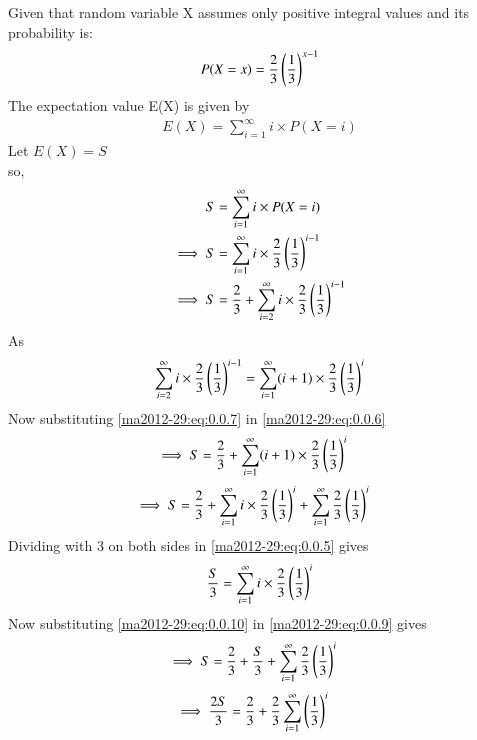 %
  Given that random variable X  assumes only positive integral values and its probability is:
  \begin{align}
      P(X=x)=\frac{2}{3}\left(\frac{1}{3}\right)^{x-1}
  \end{align}
  The expectation value E(X) is given by 
  \begin{align}
      E(X)=\sum_{i=1}^{\infty} i \times P(X=i)
  \end{align}
  Let $E(X)=S$\\
  so,
  \begin{align}
      S&=\sum_{i=1}^{\infty} i \times P(X=i)\\
    \implies S&=\sum_{i=1}^{\infty} i \times
      \frac{2}{3}\left(\frac{1}{3}\right)^{i-1}\label{ma2012-29:eq:0.0.5}\\
     \implies S&=\frac{2}{3}+\sum_{i=2}^{\infty} i \times
      \frac{2}{3}\left(\frac{1}{3}\right)^{i-1}\label{ma2012-29:eq:0.0.6}
  \end{align}
  As
  \begin{align}
      \sum_{i=2}^{\infty} i \times
      \frac{2}{3}\left(\frac{1}{3}\right)^{i-1}=\sum_{i=1}^{\infty} (i+1)\times
      \frac{2}{3}\left(\frac{1}{3}\right)^{i}\label{ma2012-29:eq:0.0.7}
  \end{align}
  Now substituting  \eqref{ma2012-29:eq:0.0.7} in \eqref{ma2012-29:eq:0.0.6}
  \begin{align}
      \implies S&=\frac{2}{3}+\sum_{i=1}^{\infty} (i+1) \times
      \frac{2}{3}\left(\frac{1}{3}\right)^{i}
  \end{align}
  \begin{align}
       \implies S&=\frac{2}{3}+\sum_{i=1}^{\infty} i \times
      \frac{2}{3}\left(\frac{1}{3}\right)^{i}+\sum_{i=1}^{\infty} 
      \frac{2}{3}\left(\frac{1}{3}\right)^{i}\label{ma2012-29:eq:0.0.9}
  \end{align}
   Dividing with 3 on both sides in \eqref{ma2012-29:eq:0.0.5} gives
   \begin{align}
      \frac{S}{3}=\sum_{i=1}^{\infty} i \times
      \frac{2}{3}\left(\frac{1}{3}\right)^{i}\label{ma2012-29:eq:0.0.10}
  \end{align}
  Now substituting \eqref{ma2012-29:eq:0.0.10} in \eqref{ma2012-29:eq:0.0.9} gives
  \begin{align}
     \implies S&=\frac{2}{3}+\frac{S}{3}+\sum_{i=1}^{\infty}\frac{2}{3}\left(\frac{1}{3}\right)^{i}
     \end{align}
     \begin{align}
     \implies \frac{2S}{3}&=\frac{2}{3}+\frac{2}{3}\sum_{i=1}^{\infty}\left(\frac{1}{3}\right)^{i}
  \end{align}
